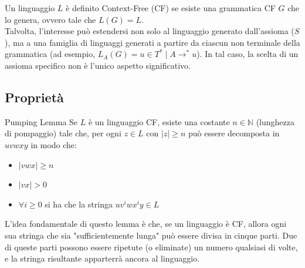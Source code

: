 \documentclass[12pt, a4paper]{report}
\begin{document}
            Un linguaggio $L$ è definito Context-Free (CF) se esiste una grammatica CF $G$ che lo genera, ovvero tale che $L(G) = L$.\\
            Talvolta, l'interesse può estendersi non solo al linguaggio generato dall'assioma ($S$), ma a una famiglia di linguaggi generati a partire da ciascun non terminale della grammatica (ad esempio, $L_A(G) = {u \in T^* \mid A \rightarrow^* u}$). In tal caso, la scelta di un assioma specifico non è l'unico aspetto significativo.
        \subsection{Proprietà}
            \begin{definitionbox}{Pumping Lemma}{}
                Se $L$ è un linguaggio CF, esiste una costante $n\in\mathbb{N}$ (lunghezza di pompaggio) tale che, per ogni $z\in L$ con $|z|\geq n$ può essere decomposta in $uvwxy$ in modo che:
                \begin{itemize}
                    \item $|vwx|\geq n$
                    \item $|vx|>0$
                    \item $\forall i\geq 0$ si ha che la stringa $uv^iwx^iy\in L$
                \end{itemize} 
            \end{definitionbox}
            L'idea fondamentale di questo lemma è che, se un linguaggio è CF, allora ogni sua stringa che sia "sufficientemente lunga" può essere divisa in cinque parti. Due di queste parti possono essere ripetute (o eliminate) un numero qualsiasi di volte, e la stringa risultante apparterrà ancora al linguaggio.
\end{document}
